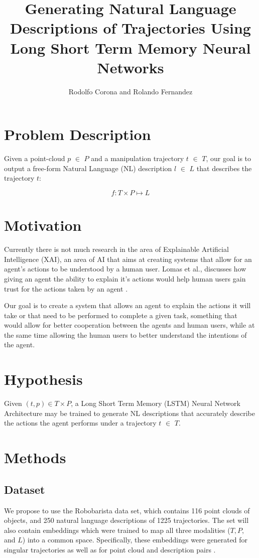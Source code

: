 \documentclass[letterpaper, 12 pt, conference]{ieeeconf}
\title{\LARGE \bf
Generating Natural Language Descriptions of Trajectories Using Long Short Term Memory Neural Networks}
\author{Rodolfo Corona and Rolando Fernandez}
\begin{document}
\maketitle
\thispagestyle{empty}
\pagestyle{empty}


\section{Problem Description}

Given a point-cloud $p$ $\in$ $P$ and a manipulation trajectory $t$ $\in$ $T$, our goal is to output a free-form  Natural Language (NL) description $l$ $\in$ $L$ that describes the trajectory $t$:

\begin{equation}
f: T\times P \mapsto L
\end{equation}

\section{Motivation}

Currently there is not much research in the area of Explainable Artificial Intelligence (XAI), an area of AI that aims at creating systems that allow for an agent's actions to be understood by a human user. Lomas et al., discusses how giving an agent the ability to explain it's actions would help human users gain trust for the actions taken by an agent \cite{lomas2012explaining}.

Our goal is to create a system that allows an agent to explain the actions it will take or that need to be performed to complete a given task, something that would allow for better cooperation between the agents and human users, while at the same time allowing the human users to better understand the intentions of the agent.

\section{Hypothesis}

Given $(t,p)\in T\times P$, a Long Short Term Memory (LSTM) Neural Network Architecture may be trained to generate NL descriptions that accurately describe the actions the agent performs under a trajectory $t$ $\in$ $T$.

\section{Methods}
\subsection{Dataset}
We propose to use the Robobarista data set, which contains 116 point clouds of objects, and 250 natural language descriptions of 1225 trajectories. The set will also contain embeddings which were trained to map all three modalities ($T,P,$ and $L$) into a common space. Specifically, these embeddings were generated for singular trajectories as well as for point cloud and description pairs \cite{sung2016robobarista}.
\end{document}
